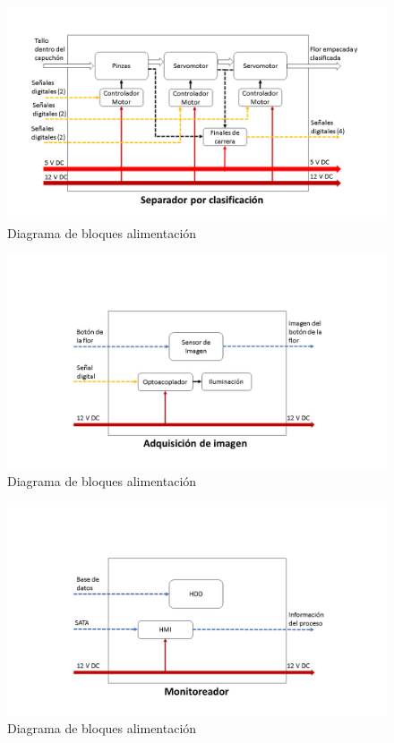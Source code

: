 \begin{figure}[H]
	\centering
	\includegraphics[scale=0.4]{Figuras/SeparadorClasificacion}
	\caption{Diagrama de bloques alimentación}
	\label{fig:DBAlimentacion}
\end{figure}

\begin{figure}[H]
	\centering
	\includegraphics[scale=0.4]{Figuras/AdquisicionImagen}
	\caption{Diagrama de bloques alimentación}
	\label{fig:DBAlimentacion}
\end{figure}

\begin{figure}[H]
	\centering
\includegraphics[scale=0.4]{Figuras/Monitoreador}
	\caption{Diagrama de bloques alimentación}
	\label{fig:DBAlimentacion}
\end{figure}

\chapterend{}